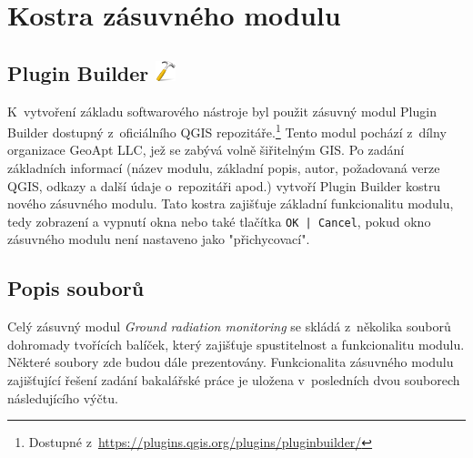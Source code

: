 \section{Kostra zásuvného modulu}
\subsection[Plugin Builder]{Plugin
Builder \includegraphics[scale=0.1]{./pictures/plugin_builder.png}}
K~vytvoření základu softwarového nástroje byl použit zásuvný modul
Plugin Builder dostupný z~oficiálního QGIS
repozitáře.\footnote{Dostupné
z~\url{https://plugins.qgis.org/plugins/pluginbuilder/}} Tento modul
pochází z~dílny organizace GeoApt LLC, jež se zabývá volně šiřitelným
GIS. Po zadání základních informací (název modulu, základní popis,
autor, požadovaná verze QGIS, odkazy a další údaje o~repozitáři apod.)
vytvoří Plugin Builder kostru nového zásuvného modulu. Tato kostra
zajišťuje základní funkcionalitu modulu, tedy zobrazení a vypnutí okna
nebo také tlačítka \texttt{OK | Cancel}, pokud okno zásuvného modulu
není nastaveno jako "přichycovací".

\subsection{Popis souborů} Celý zásuvný modul \textit{Ground radiation
monitoring} se skládá z~několika souborů dohromady tvořících balíček,
který zajišťuje spustitelnost a funkcionalitu modulu. Některé soubory
zde budou dále prezentovány. Funkcionalita zásuvného modulu
zajišťující řešení zadání bakalářské práce je uložena v~posledních
dvou souborech následujícího výčtu.

